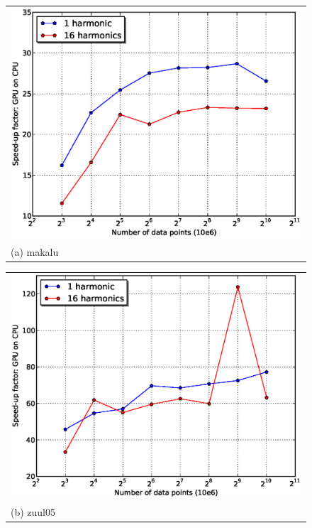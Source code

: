 \documentclass[preprint2]{aastex}
\begin{document}
\begin{figure}
  \centering
  \begin{tabular}[b]{@{}p{}@{}}
    \centering\includegraphics[width=1.0\linewidth]{fig/makalu_speed_up.eps} \\
    \centering\small (a) makalu
  \end{tabular}%
  \quad
  \begin{tabular}[b]{@{}p{}@{}}
    \centering\includegraphics[width=1.0\linewidth]{fig/zuul05_speed_up.eps} \\
    \centering\small (b) zuul05
  \end{tabular}
  \quad

\end{figure}
\end{document}

